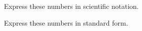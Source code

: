 \documentclass[11pt]{exam}
\begin{document}
\begin{questions}
\begin{multicols}{2}
  \end{multicols}

  \question Express these numbers in scientific notation.

  \begin{multicols}{2}
  \end{multicols}

  \question Express these numbers in standard form.

  \begin{multicols}{2}
\end{multicols}
\end{questions}
\end{document}
